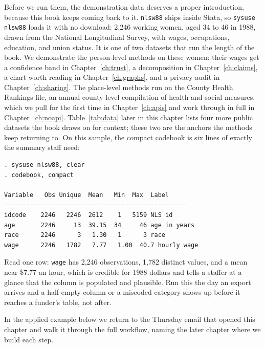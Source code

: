 \documentclass[
    a4paper,
    fontsize=10pt,
    twoside=true,
    numbers=noenddot,
]{kaobook}
\begin{document}
Before we run them, the demonstration data deserves a proper introduction, because this book keeps coming back to it. \texttt{nlsw88} ships inside Stata, so \texttt{sysuse nlsw88} loads it with no download: 2{,}246 working women, aged 34 to 46 in 1988, drawn from the National Longitudinal Survey, with wages, occupations, education, and union status. It is one of two datasets that run the length of the book. We demonstrate the person-level methods on these women: their wages get a confidence band in Chapter~\ref{ch:trust}, a decomposition in Chapter~\ref{ch:claims}, a chart worth reading in Chapter~\ref{ch:graphs}, and a privacy audit in Chapter~\ref{ch:sharing}. The place-level methods run on the County Health Rankings file, an annual county-level compilation of health and social measures, which we pull for the first time in Chapter~\ref{ch:apis} and work through in full in Chapter~\ref{ch:noapi}. Table~\ref{tab:data} later in this chapter lists four more public datasets the book draws on for context; these two are the anchors the methods keep returning to. On this sample, the compact codebook is six lines of exactly the summary staff need:
\par
{\footnotesize
\begin{verbatim}
. sysuse nlsw88, clear
. codebook, compact

Variable   Obs Unique  Mean   Min  Max  Label
--------------------------------------------------
idcode    2246   2246  2612    1   5159 NLS id
age       2246     13  39.15  34     46 age in years
race      2246      3   1.30   1      3 race
wage      2246   1782   7.77   1.00  40.7 hourly wage
\end{verbatim}
}
Read one row: \texttt{wage} has 2{,}246 observations, 1{,}782 distinct values, and a mean near \$7.77 an hour, which is credible for 1988 dollars and tells a staffer at a glance that the column is populated and plausible. Run this the day an export arrives and a half-empty column or a miscoded category shows up before it reaches a funder's table, not after.

In the applied example below we return to the Thursday email that opened this chapter and walk it through the full workflow, naming the later chapter where we build each step.
\end{document}
